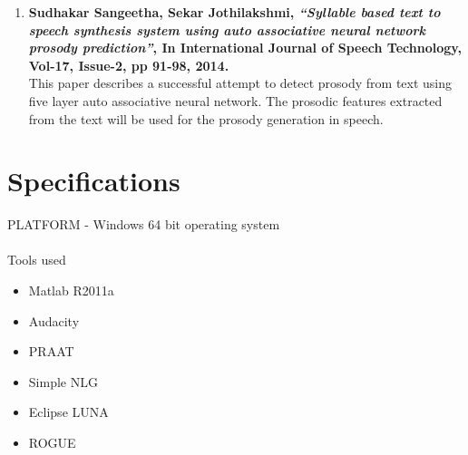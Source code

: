 \documentclass{article}
\begin{document}
\begin{enumerate}
\item \textbf{Sudhakar Sangeetha, Sekar Jothilakshmi,  \textit{“Syllable based  text to speech synthesis system using auto associative neural network prosody prediction”}, In International Journal of Speech Technology, Vol-17, Issue-2, pp 91-98, 2014.}
\\This paper describes a successful attempt to detect prosody from text using five layer auto associative neural network. The prosodic features extracted from the text will be used for the prosody generation in speech.
\end{enumerate}

\section{Specifications} \large
PLATFORM - Windows 64 bit operating system\\
\\Tools used
\begin{itemize}
\item Matlab R2011a
\item Audacity
\item PRAAT
\item Simple NLG
\item Eclipse LUNA
\item ROGUE
\end{itemize}
\end{document}
